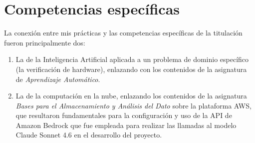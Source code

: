 \section{Competencias específicas}

La conexión entre mis prácticas y las competencias específicas de la titulación fueron principalmente dos:

\begin{enumerate}
  \item La de la Inteligencia Artificial aplicada a un problema de dominio específico (la verificación de hardware), enlazando con los contenidos de la asignatura de \emph{Aprendizaje Automático}.
  \item La de la computación en la nube, enlazando los contenidos de la asignatura \emph{Bases para el Almacenamiento y Análisis del Dato} sobre la plataforma AWS, que resultaron fundamentales para la configuración y uso de la API de Amazon Bedrock que fue empleada para realizar las llamadas al modelo Claude Sonnet 4.6 en el desarrollo del proyecto.
\end{enumerate}
